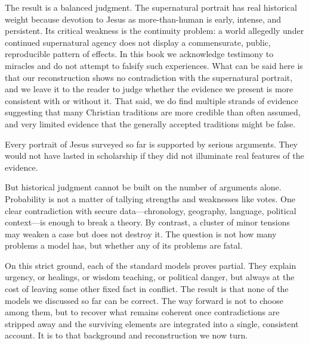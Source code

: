 The result is a balanced judgment.
The supernatural portrait has real historical weight because devotion to Jesus as more-than-human is early, intense, and persistent.
Its critical weakness is the continuity problem: a world allegedly under continued supernatural agency does not display a commensurate, public, reproducible pattern of effects.
In this book we acknowledge testimony to miracles and do not attempt to falsify such experiences.
What can be said here is that our reconstruction shows no contradiction with the supernatural portrait, and we leave it to the reader to judge whether the evidence we present is more consistent with or without it.
That said, we do find multiple strands of evidence suggesting that many Christian traditions are more credible than often assumed, and very limited evidence that the generally accepted traditions might be false.

\medskip

Every portrait of Jesus surveyed so far is supported by serious arguments.
They would not have lasted in scholarship if they did not illuminate real features of the evidence.

But historical judgment cannot be built on the number of arguments alone.
Probability is not a matter of tallying strengths and weaknesses like votes.
One clear contradiction with secure data—chronology, geography, language, political context—is enough to break a theory.
By contrast, a cluster of minor tensions may weaken a case but does not destroy it.
The question is not how many problems a model has, but whether any of its problems are fatal.

On this strict ground, each of the standard models proves partial.
They explain urgency, or healings, or wisdom teaching, or political danger, but always at the cost of leaving some other fixed fact in conflict.
The result is that none of the models we discussed so far can be correct.
The way forward is not to choose among them, but to recover what remains coherent once contradictions are stripped away and the surviving elements are integrated into a single, consistent account.
It is to that background and reconstruction we now turn.
